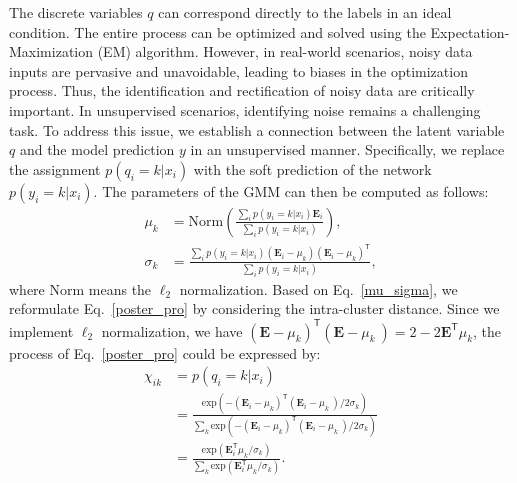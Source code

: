 \documentclass{article}
\theoremstyle{plain}
\theoremstyle{definition}
\theoremstyle{remark}
\begin{document}
The discrete variables $q$ can correspond directly to the labels in an ideal condition. The entire process can be optimized and solved using the Expectation-Maximization (EM) algorithm. However, in real-world scenarios, noisy data inputs are pervasive and unavoidable, leading to biases in the optimization process. Thus, the identification and rectification of noisy data are critically important. In unsupervised scenarios, identifying noise remains a challenging task. To address this issue, we establish a connection between the latent variable $q$ and the model prediction $y$ in an unsupervised manner. Specifically, we replace the assignment $p(q_i=k|x_i)$ with the soft prediction of the network $p(y_i=k|x_i)$. The parameters of the GMM can then be computed as follows:
\begin{equation}
\begin{aligned}
\mu_k &= \text{Norm}\left ( \frac{\sum_i p(y_i=k|x_i)\textbf{E}_i}{\sum_i p(y_i=k|x_i)} \right ),\\
\sigma_k &= \frac{\sum_i p(y_i=k|x_i)(\textbf{E}_i - \mu_k)(\textbf{E}_i - \mu_k)^{\mathsf{T}}}{\sum_i p(y_i=k|x_i)},
\end{aligned}
\label{mu_sigma}
\end{equation}
where $\text{Norm}$ means the $\ell_2$ normalization. Based on Eq.~\eqref{mu_sigma}, we reformulate Eq.~\eqref{poster_pro} by considering the intra-cluster distance. Since we implement $\ell_2$ normalization, we have $\left ( \textbf{E}-\mu_k \right )^{\mathsf{T}}\left ( \textbf{E}-\mu_k\ \right )  =2-2\textbf{E}^{\mathsf{T}}\mu_k$, the process of Eq.~\eqref{poster_pro} could be expressed by:
\begin{equation}
\begin{aligned}
\chi_{ik} &= p(q_i =k|x_i)\\
&= \frac{\text{exp}\left ( -\left ( \textbf{E}_i-\mu_k \right )^\mathsf{T} \left ( \textbf{E}_i-\mu_k\ \right ) /2\sigma_k \right )}{\sum_k{\text{exp}\left ( -\left ( \textbf{E}_i-\mu_k \right )^\mathsf{T} \left ( \textbf{E}_i-\mu_k\ \right ) /2\sigma_k \right )}}\\
&=\frac{\text{exp}\left ( \textbf{E}_i^\mathsf{T}\mu_k/\sigma_k \right )}{\sum_k{\text{exp}\left ( \textbf{E}_i^\mathsf{T}\mu_k/\sigma_k \right )}}.
\end{aligned}
\label{k-cluster}
\end{equation}
\end{document}
